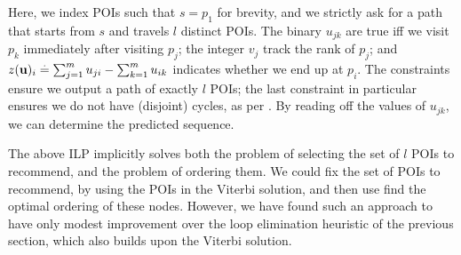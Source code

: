 \vspace{0.5\baselineskip}

Here, we index POIs such that $s = p_1$ for brevity,
and we strictly ask for a path that starts from $s$ and travels $l$ distinct POIs.
The binary $u_{jk}$ are true iff
we visit $p_k$ immediately after visiting $p_j$;
the integer $v_j$ track the rank of $p_j$;
and $z(\mathbf{u})_i \stackrel{.}{=} \sum_{j=1}^m u_{ji} - \sum_{k=1}^m u_{ik}$ indicates whether we end up at $p_i$.
The constraints ensure we output a path of exactly $l$ POIs;
the last constraint in particular ensures we do not have (disjoint) cycles, as per \citet{Miller:1960}.
By reading off the values of $u_{jk}$, we can determine the predicted sequence.

The above ILP implicitly solves both the problem of selecting the set of $l$ POIs to recommend,
and the problem of ordering them.
We could fix the set of POIs to recommend, \eg by using the POIs in the Viterbi solution, and then use find the optimal ordering of these nodes.
However, we have found such an approach to have only modest improvement over the loop elimination heuristic of the previous section, which also builds upon the Viterbi solution.
